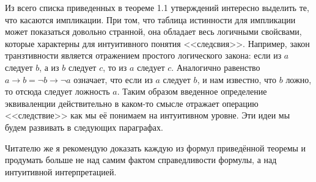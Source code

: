Из всего списка приведенных в теореме 1.1 утверждений интересно выделить те, что касаются импликации. При том, что таблица истинности для импликации может показаться довольно странной,  она обладает весь логичными свойсвами, которые характерны для интуитивного понятия <<следсвия>>. Например, закон транзтивности является отражением простого логического закона: если из $a$ следует $b$, а из $b$ следует $c$, то из $a$ следует $c$. Аналогично равенство $a \rightarrow b = \neg b \rightarrow \neg a$ означает, что если из $a$ следует $b$, и нам известно, что $b$ ложно, то отсюда следует ложность $a$. Таким образом введенное определение эквиваленции действительно в каком-то смысле отражает операцию <<следствие>> как мы её понимаем на интуитивном уровне. Эти идеи мы будем развивать в следующих параграфах.

Читателю же я рекомендую доказать каждую из формул приведённой теоремы и продумать больше не над самим фактом справедливости формулы, а над интуитивной интерпретацией.


